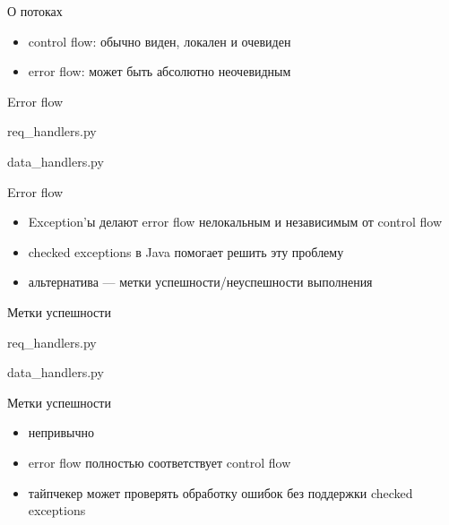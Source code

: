 \documentclass[10pt]{beamer}
\begin{document}
\begin{frame}{О потоках}
  \begin{itemize}
  \item control flow: обычно виден, локален и очевиден
  \item error flow: может быть абсолютно неочевидным
  \end{itemize}
\end{frame}

\begin{frame}{Error flow}
  \begin{block}{req\_handlers.py}
    \centering
    \small
    \lstset{language=python}
    
  \end{block}
  \begin{block}{data\_handlers.py}
    \centering
    \small
    \lstset{language=python}
    
  \end{block}
\end{frame}

\begin{frame}{Error flow}
  \begin{itemize}
  \item Exception'ы делают error flow нелокальным и независимым от control flow
  \item checked exceptions в Java помогает решить эту проблему
  \item альтернатива — метки успешности/неуспешности выполнения
  \end{itemize}
\end{frame}

\begin{frame}{Метки успешности}
  \begin{block}{req\_handlers.py}
    \centering
    \small
    \lstset{language=python}
    
  \end{block}
  \begin{block}{data\_handlers.py}
    \centering
    \small
    \lstset{language=python}
    
  \end{block}
\end{frame}

\begin{frame}{Метки успешности}
  \begin{itemize}
  \item непривычно
  \item error flow полностью соответствует control flow
  \item тайпчекер может проверять обработку ошибок без поддержки checked exceptions
  \end{itemize}
\end{frame}
\end{document}
